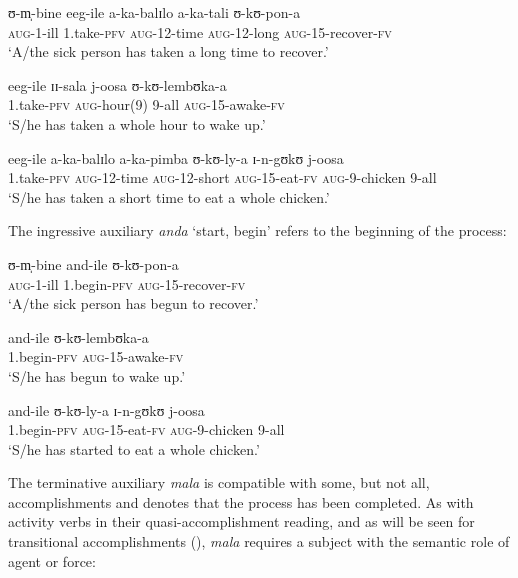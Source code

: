 \begin{exe}
\ex
\begin{xlist}
\ex \gll ʊ-m̩-bine eeg-ile a-ka-balɪlo a-ka-tali ʊ-kʊ-pon-a\\
\textsc{aug}-1-ill 1.take-\textsc{pfv} \textsc{aug}-12-time \textsc{aug}-12-long \textsc{aug}-15-recover-\textsc{fv}\\
\glt \lq A/the sick person has taken a long time to recover.'

\ex \gll eeg-ile ɪɪ-sala j-oosa ʊ-kʊ-lembʊka-a\\
1.take-\textsc{pfv} \textsc{aug}-hour(9) 9-all \textsc{aug}-15-awake-\textsc{fv}\\
\glt \lq S/he has taken a whole hour to wake up.'

\ex \gll eeg-ile a-ka-balɪlo a-ka-pimba ʊ-kʊ-ly-a ɪ-n-gʊkʊ j-oosa\\
1.take-\textsc{pfv} \textsc{aug}-12-time \textsc{aug}-12-short \textsc{aug}-15-eat-\textsc{fv} \textsc{aug}-9-chicken 9-all\\
\glt \lq S/he has taken a short time to eat a whole chicken.'
\end{xlist}
\end{exe}

The ingressive auxiliary \textit{anda} \lq start, begin' refers to the beginning of the process:
\begin{exe}
\ex\begin{xlist}
\ex \gll ʊ-m̩-bine and-ile ʊ-kʊ-pon-a\\
\textsc{aug}-1-ill 1.begin-\textsc{pfv} \textsc{aug}-15-recover-\textsc{fv}\\
\glt \lq A/the sick person has begun to recover.'

\ex \gll and-ile ʊ-kʊ-lembʊka-a\\
1.begin-\textsc{pfv} \textsc{aug}-15-awake-\textsc{fv}\\
\glt \lq S/he has begun to wake up.'

\ex \gll and-ile ʊ-kʊ-ly-a ɪ-n-gʊkʊ j-oosa\\
1.begin-\textsc{pfv} \textsc{aug}-15-eat-\textsc{fv} \textsc{aug}-9-chicken 9-all\\
\glt \lq S/he has started to eat a whole chicken.'
\end{xlist}
\end{exe}
The terminative auxiliary \textit{mala} is compatible with some, but not all, accomplishments and denotes that the process has been completed. As with activity verbs in their quasi-accomplishment reading, and as will be seen for transitional accomplishments (), \textit{mala} requires a subject with the semantic role of agent or force:

